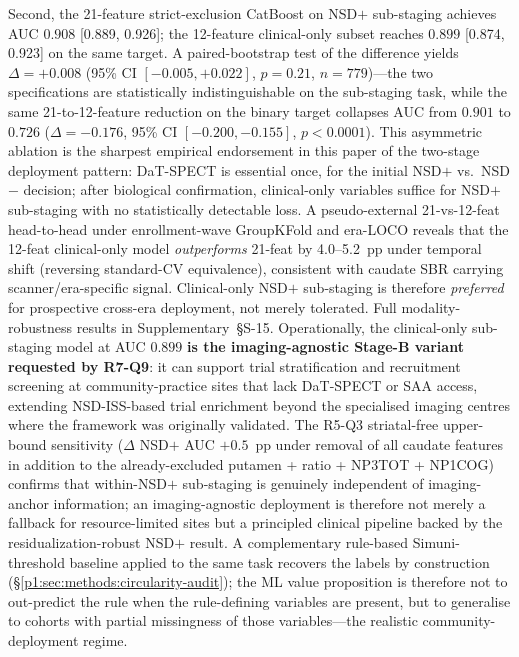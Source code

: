 Second, the 21-feature strict-exclusion CatBoost on NSD$+$ sub-staging achieves AUC $0.908$ [0.889, 0.926]; the 12-feature clinical-only subset reaches $0.899$ [0.874, 0.923] on the same target. A paired-bootstrap test of the difference yields $\Delta{=}+0.008$ (95\% CI $[-0.005, +0.022]$, $p{=}0.21$, $n{=}779$)---the two specifications are statistically indistinguishable on the sub-staging task, while the same 21-to-12-feature reduction on the binary target collapses AUC from $0.901$ to $0.726$ ($\Delta{=}-0.176$, 95\% CI $[-0.200, -0.155]$, $p{<}0.0001$). This asymmetric ablation is the sharpest empirical endorsement in this paper of the two-stage deployment pattern: DaT-SPECT is essential once, for the initial NSD$+$ vs.\ NSD$-$ decision; after biological confirmation, clinical-only variables suffice for NSD$+$ sub-staging with no statistically detectable loss. A pseudo-external 21-vs-12-feat head-to-head under enrollment-wave GroupKFold and era-LOCO reveals that the 12-feat clinical-only model \emph{outperforms} 21-feat by 4.0--5.2~pp under temporal shift (reversing standard-CV equivalence), consistent with caudate SBR carrying scanner/era-specific signal. Clinical-only NSD$+$ sub-staging is therefore \emph{preferred} for prospective cross-era deployment, not merely tolerated. Full modality-robustness results in Supplementary~\S{}S-15. Operationally, the clinical-only sub-staging model at AUC $0.899$ \textbf{is the imaging-agnostic Stage-B variant requested by R7-Q9}: it can support trial stratification and recruitment screening at community-practice sites that lack DaT-SPECT or SAA access, extending NSD-ISS-based trial enrichment beyond the specialised imaging centres where the framework was originally validated. The R5-Q3 striatal-free upper-bound sensitivity ($\Delta$ NSD$+$ AUC $+0.5$~pp under removal of all caudate features in addition to the already-excluded putamen + ratio + NP3TOT + NP1COG) confirms that within-NSD$+$ sub-staging is genuinely independent of imaging-anchor information; an imaging-agnostic deployment is therefore not merely a fallback for resource-limited sites but a principled clinical pipeline backed by the residualization-robust NSD$+$ result. A complementary rule-based Simuni-threshold baseline applied to the same task recovers the labels by construction (\S\ref{p1:sec:methods:circularity-audit}); the ML value proposition is therefore not to out-predict the rule when the rule-defining variables are present, but to generalise to cohorts with partial missingness of those variables---the realistic community-deployment regime.

